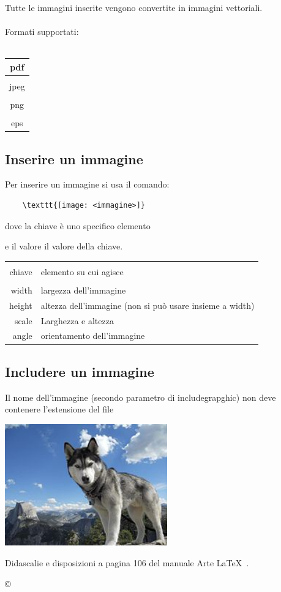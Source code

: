 \documentclass[a4paper]{article}
\begin{document}
Tutte le immagini inserite vengono convertite in immagini vettoriali.
\\\\
Formati supportati:
\\\\
\begin{tabular}{|c|}
\hline
pdf\\
\hline\\
jpeg\\
\hline\\
png\\
\hline\\
eps\\
\hline
\end{tabular}

\subsection{Inserire un immagine}

Per inserire un immagine si usa il comando:

\begin{verbatim}
    \texttt{[image: <immagine>]}
\end{verbatim}

dove la chiave è uno specifico elemento

e il valore il valore della chiave.

\begin{tabular}{r|l}
\hline\\
chiave & elemento su cui agisce\\
\hline\\
width & largezza dell'immagine\\
height & altezza dell'immagine (non si può usare insieme a width)\\
scale & Larghezza e altezza\\
angle & orientamento dell'immagine
\end{tabular}




\newpage


\subsection{Includere un immagine}

Il nome dell'immagine (secondo parametro di includegrapghic) non deve contenere l'estensione del file

\begin{center}
\includegraphics[width=7cm]{siberian}
\end{center}

Didascalie e disposizioni a pagina 106 del manuale Arte \LaTeX\ .


\vspace{4cm}
\begin{center}
\copyright {}
\end{center}
\end{document}
